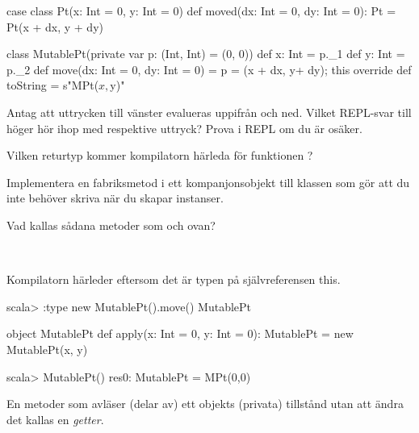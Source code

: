 \begin{Code}
case class Pt(x: Int = 0, y: Int = 0) {
  def moved(dx: Int = 0, dy: Int = 0): Pt = Pt(x + dx, y + dy)
}

class MutablePt(private var p: (Int, Int) = (0, 0)) {
  def x: Int = p._1
  def y: Int = p._2
  def move(dx: Int = 0, dy: Int = 0) = { p = (x + dx, y+ dy); this }
  override def toString = s"MPt($x,$y)"
}
\end{Code}

\Subtask
Antag att uttrycken till vänster evalueras uppifrån och ned. Vilket REPL-svar till höger hör ihop med respektive uttryck? Prova i REPL om du är osäker.

\begin{ConceptConnections}

\end{ConceptConnections}

\Subtask Vilken returtyp kommer kompilatorn härleda för funktionen ?

\Subtask Implementera en fabriksmetod  i ett kompanjonsobjekt till klassen  som gör att du inte behöver skriva  när du skapar instanser.

\Subtask Vad kallas sådana metoder som  och  ovan?

\SOLUTION

\TaskSolved \what~

\SubtaskSolved

\begin{ConceptConnections}

\end{ConceptConnections}


\SubtaskSolved Kompilatorn härleder  eftersom det är typen på självreferensen this.
\begin{REPL}
scala> :type new MutablePt().move()
MutablePt
\end{REPL}

\SubtaskSolved
\begin{Code}
object MutablePt {
  def apply(x: Int = 0, y: Int = 0): MutablePt = new MutablePt(x, y)
}
\end{Code}

\begin{REPL}
scala> MutablePt()
res0: MutablePt = MPt(0,0)
\end{REPL}


\SubtaskSolved En metoder som avläser (delar av) ett objekts (privata) tillstånd utan att ändra det kallas en \emph{getter}.

